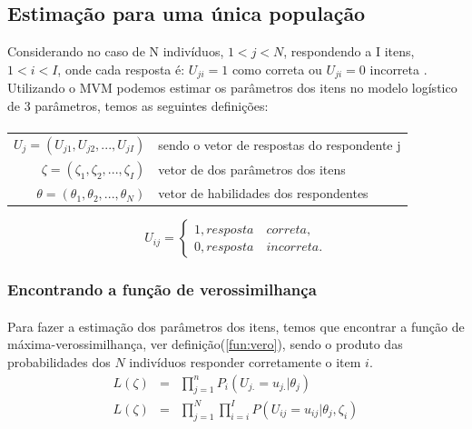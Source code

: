 	\subsection{Estimação para uma única população}
	\cite{George} 
    	Considerando no caso de N indivíduos, $1 < j < N$, respondendo a I itens, $1 < i < I$, onde cada resposta é: $U_{ji} = 1$ como correta ou $U_{ji} = 0$ incorreta . Utilizando o MVM podemos estimar os parâmetros dos itens no modelo logístico de 3 parâmetros, temos as seguintes definições:
	\paragraph{}
	\begin{table}[!h]
	    \centering
    	\begin{tabular}{rl}
    	    $U_j = (U_{j1},U_{j2},...,U_{jI})$ & sendo o vetor de respostas do respondente j\\ 
        	$\zeta = (\zeta_1,\zeta_2,...,\zeta_I)$ & vetor de dos parâmetros dos itens\\
    	    $\theta = (\theta_1,\theta_2,...,\theta_N)$ & vetor de habilidades dos respondentes
    	\end{tabular}
	\end{table}
  
	$$
	U_{ij} = \left\{
	\begin{array}{ll}
    	1, resposta \quad correta,\\
    	0, resposta \quad incorreta.
    	
    	\end{array}\right.
	$$
	
	\subsubsection{Encontrando a função de verossimilhança}
	\paragraph{}
	    Para fazer a estimação dos parâmetros dos itens, temos que encontrar a função de máxima-verossimilhança, ver definição(\ref{fun:vero}), sendo o produto das probabilidades dos $N$ indivíduos responder corretamente o item $i$.
	\begin{eqnarray}
		L(\zeta) &=& \prod_{j = 1}^{n}P_i(U_{j.} = u_{j.}|\theta_j)\\
		L(\zeta) &=& \prod_{j=1}^{N}\prod_{i = i}^{I}P(U_{ij} = u_{ij}|\theta_j,\zeta_i)
	\end{eqnarray}
	
